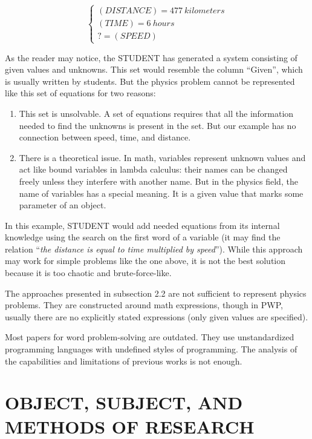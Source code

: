 \documentclass[a4paper, 12pt]{article}
\newcommand{\etext}[1]{\enquote{\textit{#1}}}
\begin{document}
	$$
	\begin{cases}
		(DISTANCE) = 477\ kilometers \\
		
		(TIME) = 6\ hours \\
		
		? = (SPEED)
	\end{cases}
	$$
	
	As the reader may notice, the STUDENT has generated a system consisting
	of given values and unknowns. This set would resemble the column
	\enquote{Given}, which is usually written by students. But the physics problem
	cannot be represented like this set of equations for two reasons:
	
	\begin{enumerate}[label=\arabic*)]
	\item
	  This set is unsolvable. A set of equations requires that all the
	  information needed to find the unknowns is present in the set. But our
	  example has no connection between speed, time, and distance.
	\item
	  There is a theoretical issue. In math, variables represent unknown
	  values and act like bound variables in lambda calculus: their names
	  can be changed freely unless they interfere with another name. But in
	  the physics field, the name of variables has a special meaning. It is
	  a given value that marks some parameter of an object.
	\end{enumerate}
	
	In this example, STUDENT would add needed equations from its internal
	knowledge using the search on the first word of a variable (it may find
	the relation \etext{the distance is equal to time multiplied by
	speed}). While this approach may work for simple problems like the one
	above, it is not the best solution because it is too chaotic and
	brute-force-like.
	
	The approaches presented in subsection 2.2 are not sufficient to
	represent physics problems. They are constructed around math
	expressions, though in PWP, usually there are no explicitly stated
	expressions (only given values are specified).
	
	Most papers for word problem-solving are outdated. They use
	unstandardized programming languages with undefined styles of
	programming. The analysis of the capabilities and limitations of
	previous works is not enough.
	
	\section{OBJECT, SUBJECT, AND METHODS OF RESEARCH}
	
\end{document}
